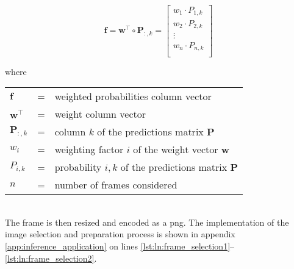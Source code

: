 \begin{equation}
  \boldsymbol{f} = \boldsymbol{w}^\top \circ \boldsymbol{P}_{:,k} =
  \begin{bmatrix}
    w_{1} \cdot P_{1,k} \\
    w_{2} \cdot P_{2,k} \\
    \vdots \\
    w_{n} \cdot P_{n,k} \\
  \end{bmatrix}
  \label{eq:weighted_probabilities}
\end{equation}

where

\begin{tabular}{lll}
  $\boldsymbol{f}$ & = & weighted probabilities column vector \\
  $\boldsymbol{w}^\top$ & = & weight column vector \\
  $\boldsymbol{P}_{:,k}$ & = & column $k$ of the predictions matrix $\boldsymbol{P}$ \\
  $w_i$ & = & weighting factor $i$ of the weight vector $\boldsymbol{w}$ \\
  $P_{i,k}$ & = & probability $i,k$ of the predictions matrix $\boldsymbol{P}$ \\
  $n$ & = & number of frames considered \\
\end{tabular}
\\

The frame is then resized and encoded as a \acrshort{png}.
The implementation of the image selection and preparation process is shown in appendix \ref{app:inference_application} on lines \ref{lst:ln:frame_selection1}--\ref{lst:ln:frame_selection2}.


